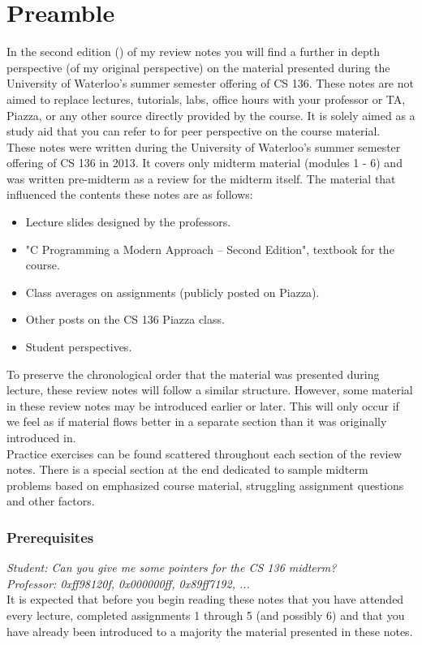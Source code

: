 \section*{Preamble}

In the second edition (\docbuild) of my review notes you will find a further in depth perspective (of my original perspective) on the material presented during the University of Waterloo's summer semester offering of CS 136. These notes are not aimed to replace lectures, tutorials, labs, office hours with your professor or TA, Piazza, or any other source directly provided by the course. It is solely aimed as a study aid that you can refer to for peer perspective on the course material.\\

These notes were written during the University of Waterloo's summer semester offering of CS 136 in 2013. It covers only midterm material (modules 1 - 6) and was written pre-midterm as a review for the midterm itself. The material that influenced the contents these notes are as follows:

\begin{itemize}

\item Lecture slides designed by the professors.
\item "C Programming a Modern Approach -- Second Edition", textbook for the course.
\item Class averages on assignments (publicly posted on Piazza).
\item Other posts on the CS 136 Piazza class.
\item Student perspectives.

\end{itemize}

To preserve the chronological order that the material was presented during lecture, these review notes will follow a similar structure. However, some material in these review notes may be introduced earlier or later. This will only occur if we feel as if material flows better in a separate section than it was originally introduced in.\\

Practice exercises can be found scattered throughout each section of the review notes. There is a special section at the end dedicated to sample midterm problems based on emphasized course material, struggling assignment questions and other factors.

\subsubsection*{Prerequisites}

\textit{Student: Can you give me some pointers for the CS 136 midterm?}\\
\textit{Professor: 0xff98120f, 0x000000ff, 0x89ff7192, ...}\\

It is expected that before you begin reading these notes that you have attended every lecture, completed assignments 1 through 5 (and possibly 6) and that you have already been introduced to a majority the material presented in these notes.